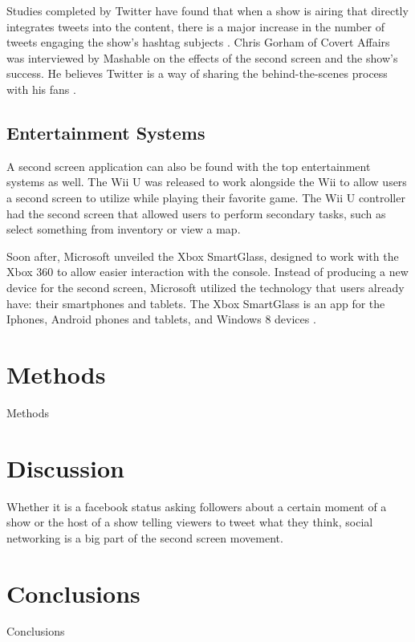 \documentclass[11pt, oneside]{article}
\begin{document}
Studies completed by Twitter have found that when a show is airing that directly integrates tweets into the content, there is a major increase in the number of tweets engaging the show's hashtag subjects \cite{TwitterTV}. Chris Gorham of Covert Affairs was interviewed by Mashable on the effects of the second screen and the show's success. He believes Twitter is a way of sharing the behind-the-scenes process with his fans \cite{MashableChris}.

\subsection{Entertainment Systems}
A second screen application can also be found with the top entertainment systems as well. The Wii U was released to work alongside the Wii to allow users a second screen to utilize while playing their favorite game. The Wii U controller had the second screen that allowed users to perform secondary tasks, such as select something from inventory or view a map. 

Soon after, Microsoft unveiled the Xbox SmartGlass, designed to work with the Xbox 360 to allow easier interaction with the console. Instead of producing a new device for the second screen, Microsoft utilized the technology that users already have: their smartphones and tablets. The Xbox SmartGlass is an app for the Iphones, Android phones and tablets, and Windows 8 devices \cite{MashableSmartGlass}.

\section{Methods}
Methods

\section{Discussion}
Whether it is a facebook status asking followers about a certain moment of a show or the host of a show telling viewers to tweet what they think, social networking is a big part of the second screen movement. 

\section{Conclusions}
Conclusions

{}

\end{document}
